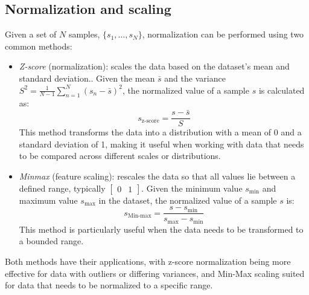 \subsection{Normalization and scaling}
Given a set of $N$ samples, $\{s_1,\dots,s_N\}$, normalization can be performed using two common methods:
\begin{itemize}
    \item \textit{Z-score} (normalization): scales the data based on the dataset's mean and standard deviation.. 
        Given the mean $\bar{s}$ and the variance $S^2=\frac{1}{N-1}\sum_{n=1}^N(s_n-\bar{s})^2$, the normalized value of a sample $s$ is calculated as:
        \[s_{\text{z-score}}=\dfrac{s-\bar{s}}{S}\]
        This method transforms the data into a distribution with a mean of 0 and a standard deviation of 1, making it useful when working with data that needs to be compared across different scales or distributions.
    \item \textit{Minmax} (feature scaling): rescales the data so that all values lie between a defined range, typically $\begin{bmatrix} 0 & 1 \end{bmatrix}$.
        Given the minimum value $s_{\min}$ and maximum value $s_{\max}$ in the dataset, the normalized value of a sample $s$ is: 
        \[s_{\text{Min-max}}=\dfrac{s-s_{\min}}{s_{\max}-s_{\min}}\]
        This method is particularly useful when the data needs to be transformed to a bounded range.
\end{itemize}
Both methods have their applications, with z-score normalization being more effective for data with outliers or differing variances, and Min-Max scaling suited for data that needs to be normalized to a specific range.


